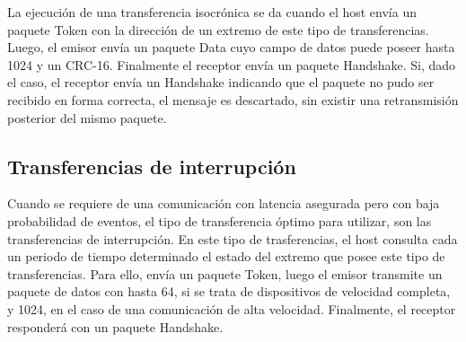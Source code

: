 	La ejecución de una transferencia isocrónica se da cuando el host envía un paquete Token con la dirección de un extremo de este tipo de transferencias. Luego, el emisor envía un paquete Data cuyo campo de datos puede poseer hasta \SI{1024}{\byte} y un CRC-16. Finalmente el receptor envía un paquete Handshake. Si, dado el caso, el receptor envía un Handshake indicando que el paquete no pudo ser recibido en forma correcta, el mensaje es descartado, sin existir una retransmisión posterior del mismo paquete.
	
\subsection{Transferencias de interrupción}
	Cuando se requiere de una comunicación con latencia asegurada pero con baja probabilidad de eventos, el tipo de transferencia óptimo para utilizar, son las transferencias de interrupción. En este tipo de trasferencias, el host consulta cada un periodo de tiempo determinado el estado del extremo que posee este tipo de transferencias. Para ello, envía un paquete Token, luego el emisor transmite un paquete de datos con hasta \SI{64}{\byte}, si se trata de dispositivos de velocidad completa, y \SI{1024}{\byte}, en el caso de una comunicación de alta velocidad. Finalmente, el receptor responderá con un paquete Handshake.
